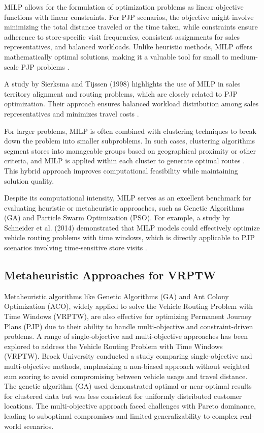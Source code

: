 MILP allows for the formulation of optimization problems as linear objective functions with linear constraints. For PJP scenarios, the objective might involve minimizing the total distance traveled or the time taken, while constraints ensure adherence to store-specific visit frequencies, consistent assignments for sales representatives, and balanced workloads. Unlike heuristic methods, MILP offers mathematically optimal solutions, making it a valuable tool for small to medium-scale PJP problems \cite{Laporte2017}.

A study by Sierksma and Tijssen (1998) highlights the use of MILP in sales territory alignment and routing problems, which are closely related to PJP optimization. Their approach ensures balanced workload distribution among sales representatives and minimizes travel costs \cite{Sierksma1998}.

For larger problems, MILP is often combined with clustering techniques to break down the problem into smaller subproblems. In such cases, clustering algorithms segment stores into manageable groups based on geographical proximity or other criteria, and MILP is applied within each cluster to generate optimal routes \cite{Nagy2007}. This hybrid approach improves computational feasibility while maintaining solution quality.

Despite its computational intensity, MILP serves as an excellent benchmark for evaluating heuristic or metaheuristic approaches, such as Genetic Algorithms (GA) and Particle Swarm Optimization (PSO). For example, a study by Schneider et al. (2014) demonstrated that MILP models could effectively optimize vehicle routing problems with time windows, which is directly applicable to PJP scenarios involving time-sensitive store visits \cite{Schneider2014}.

\subsection{Metaheuristic Approaches for VRPTW}
Metaheuristic algorithms like Genetic Algorithms (GA) and Ant Colony Optimization (ACO), widely applied to solve the Vehicle Routing Problem with Time Windows (VRPTW), are also effective for optimizing Permanent Journey Plans (PJP) due to their ability to handle multi-objective and constraint-driven problems.
A range of single-objective and multi-objective approaches has been explored to address the Vehicle Routing Problem with Time Windows (VRPTW). Brock University conducted a study \cite{ombuki2006multi} comparing single-objective and multi-objective methods, emphasizing a non-biased approach without weighted sum scoring to avoid compromising between vehicle usage and travel distance. The genetic algorithm (GA) used demonstrated optimal or near-optimal results for clustered data but was less consistent for uniformly distributed customer locations. The multi-objective approach faced challenges with Pareto dominance, leading to suboptimal compromises and limited generalizability to complex real-world scenarios.

